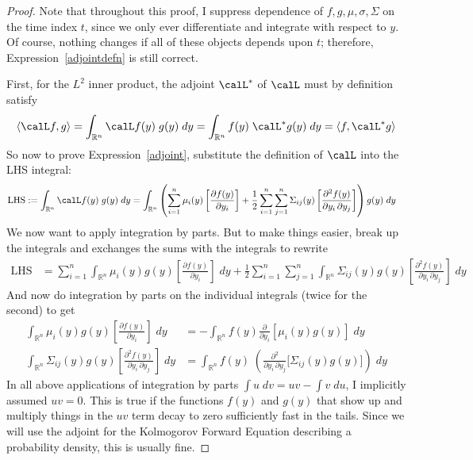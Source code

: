 \documentclass[12pt]{article}
\theoremstyle{plain}
\theoremstyle{definition}
\theoremstyle{remark}
\newcommand{\Rn}{\mathbb{R}^n}
\newcommand{\sumin}{\sum^n_{i=1}}
\newcommand{\sumjn}{\sum^n_{j=1}}
\begin{document}
\begin{proof}
Note that throughout this proof, I suppress dependence of
$f,g,\mu,\sigma,\Sigma$ on the time index $t$, since we only ever
differentiate and integrate with respect to $y$.
Of course, nothing changes if all of these objects depends upon $t$;
therefore, Expression~\ref{adjointdefn} is still correct.

First, for the $L^2$ inner product, the adjoint $\calL^*$ of $\calL$
must by definition satisfy
\begin{align}
  \langle \calL f, g\rangle
  =
  \int_{\Rn} \calL f(y)\; g(y)\;dy
  =
  \int_{\Rn} f(y)\;\calL^* g(y)\;dy
  =
  \langle f,  \calL^* g\rangle
  \label{adjoint}
\end{align}
So now to prove Expression~\ref{adjoint}, substitute the definition of
$\calL$ into the LHS integral:
\begin{align*}
  \text{LHS} :=
  \int_{\Rn} \calL f(y)\; g(y)\;dy
  &=
  \int_{\Rn}
  \left(
  \sumin
  \mu_i(y)
  \left[
  \frac{\partial f(y)}{\partial y_i}
  \right]
  +
  \frac{1}{2}
  \sumin
  \sumjn
  \Sigma_{ij}(y)
  \left[
  \frac{\partial^2 f(y)}{\partial y_i\,\partial y_j}
  \right]
  \right)
  g(y)\;dy
\end{align*}
We now want to apply integration by parts. But to make things easier,
break up the integrals and exchanges the sums with the integrals to
rewrite
\begin{align*}
  \text{LHS}
  &=
  \sumin
  \int_{\Rn}
  \mu_i(y)
  g(y)
  \left[
  \frac{\partial f(y)}{\partial y_i}
  \right]
  \;dy
  +
  \frac{1}{2}
  \sumin
  \sumjn
  \int_{\Rn}
  \Sigma_{ij}(y)
  g(y)
  \left[
  \frac{\partial^2 f(y)}{\partial y_i\,\partial y_j}
  \right]
  \;dy
\end{align*}
And now do integration by parts on the individual integrals (twice for
the second) to get
\begin{align*}
  \int_{\Rn}
  \mu_i(y)
  g(y)
  \left[
  \frac{\partial f(y)}{\partial y_i}
  \right]
  \;dy
  &=
  -
  \int_{\Rn}
  f(y)
  \frac{\partial}{\partial y_i}
  \left[
  \mu_i(y)
  g(y)
  \right]
  \;dy
  \\
  \int_{\Rn}
  \Sigma_{ij}(y)
  g(y)
  \left[
  \frac{\partial^2 f(y)}{\partial y_i\,\partial y_j}
  \right]
  \;dy
  &=
  \int_{\Rn}
  f(y)
  \;
  \left(
  \frac{\partial^2 }{\partial y_i\,\partial y_j}
  \big[
  \Sigma_{ij}(y)
  g(y)
  \big]
  \right)
  \;dy
\end{align*}
In all above applications of integration by parts
$\int u\;dv = uv - \int v\;du$, I implicitly assumed $uv=0$.
This is true if the functions $f(y)$ and $g(y)$ that show up and
multiply things in the $uv$ term decay to zero sufficiently fast in the
tails. Since we will use the adjoint for the Kolmogorov Forward Equation
describing a probability density, this is usually fine.


\end{proof}
\end{document}
